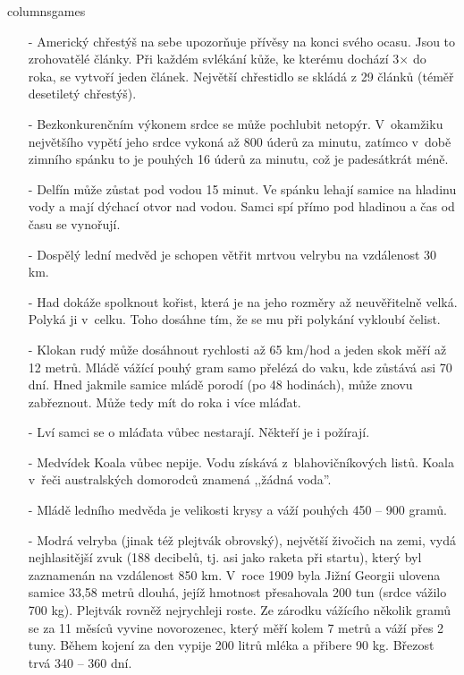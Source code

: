 \begin{multicols}{\value{columnsgames}columnsgames}
\begin{itemize}
\itemsep -3pt

\item[-] Americký chřestýš na sebe upozorňuje přívěsy na konci svého 
ocasu. Jsou to zrohovatělé články. Při každém svlékání kůže, 
ke kterému dochází 3$\times$ do roka, se vytvoří jeden článek. Největší
chřestidlo se skládá z 29 článků (téměř desetiletý chřestýš).

\item[-] Bezkonkurenčním výkonem srdce se může pochlubit netopýr. V~okamžiku 
největšího vypětí jeho srdce vykoná až 800 úderů za minutu, zatímco 
v~době zimního spánku to je pouhých 16 úderů za minutu, 
což je padesátkrát méně.

\item[-] Delfín může zůstat pod vodou 15 minut. Ve spánku lehají samice 
na hladinu vody a mají dýchací otvor nad vodou. Samci spí přímo 
pod hladinou a čas od času se vynořují.

\item[-] Dospělý lední medvěd je schopen větřit mrtvou velrybu na vzdálenost 
30 km.

\item[-] Had dokáže spolknout kořist, která je na jeho rozměry až neuvěřitelně 
velká. Polyká ji v~celku. Toho dosáhne tím, že se mu při 
polykání vykloubí čelist.

\item[-] Klokan rudý může dosáhnout rychlosti až 65 km/hod a jeden skok 
měří až 12 metrů. Mládě vážící pouhý gram samo přelézá do vaku, 
kde zůstává asi 70 dní. Hned jakmile samice mládě porodí (po 
48 hodinách), může znovu zabřeznout. Může tedy mít do roka i 
více mláďat.

\item[-] Lví samci se o mláďata vůbec nestarají. Někteří je i požírají.

\item[-] Medvídek Koala vůbec nepije. Vodu získává z~blahovičníkových 
listů. Koala v~řeči australských domorodců znamená ,,žádná 
voda''.

\item[-] Mládě ledního medvěda je velikosti krysy a váží pouhých 
450 -- 900 gramů.

\item[-] Modrá velryba (jinak též plejtvák obrovský), největší živočich 
na zemi, vydá nejhlasitější zvuk (188 decibelů, tj. asi jako 
raketa při startu), který byl zaznamenán na vzdálenost 850 km. 
V~roce 1909 byla Jižní Georgii ulovena samice 33,58 metrů 
dlouhá, jejíž hmotnost přesahovala 200 tun (srdce vážilo 700 
kg). Plejtvák rovněž nejrychleji roste. Ze zárodku vážícího několik 
gramů se za 11 měsíců vyvine novorozenec, který měří kolem 7 
metrů a váží přes 2 tuny. Během kojení za den vypije 200 litrů 
mléka a přibere 90 kg. Březost trvá 340 -- 360 dní.


\end{itemize}
\end{multicols}
